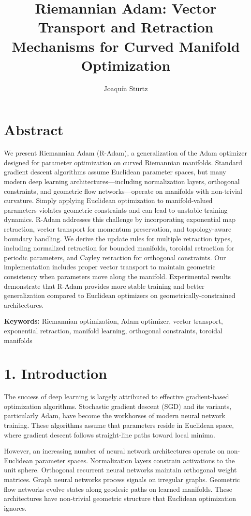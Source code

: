 \documentclass[12pt]{article}
\title{\textbf{Riemannian Adam: Vector Transport and Retraction Mechanisms for Curved Manifold Optimization}}
\author{Joaquín Stürtz}
\date{}
\begin{document}
\maketitle

\section*{Abstract}

We present Riemannian Adam (R-Adam), a generalization of the Adam optimizer designed for parameter optimization on curved Riemannian manifolds. Standard gradient descent algorithms assume Euclidean parameter spaces, but many modern deep learning architectures—including normalization layers, orthogonal constraints, and geometric flow networks—operate on manifolds with non-trivial curvature. Simply applying Euclidean optimization to manifold-valued parameters violates geometric constraints and can lead to unstable training dynamics. R-Adam addresses this challenge by incorporating exponential map retraction, vector transport for momentum preservation, and topology-aware boundary handling. We derive the update rules for multiple retraction types, including normalized retraction for bounded manifolds, toroidal retraction for periodic parameters, and Cayley retraction for orthogonal constraints. Our implementation includes proper vector transport to maintain geometric consistency when parameters move along the manifold. Experimental results demonstrate that R-Adam provides more stable training and better generalization compared to Euclidean optimizers on geometrically-constrained architectures.

\textbf{Keywords:} Riemannian optimization, Adam optimizer, vector transport, exponential retraction, manifold learning, orthogonal constraints, toroidal manifolds

\section{1. Introduction}

The success of deep learning is largely attributed to effective gradient-based optimization algorithms. Stochastic gradient descent (SGD) and its variants, particularly Adam, have become the workhorses of modern neural network training. These algorithms assume that parameters reside in Euclidean space, where gradient descent follows straight-line paths toward local minima.

However, an increasing number of neural network architectures operate on non-Euclidean parameter spaces. Normalization layers constrain activations to the unit sphere. Orthogonal recurrent neural networks maintain orthogonal weight matrices. Graph neural networks process signals on irregular graphs. Geometric flow networks evolve states along geodesic paths on learned manifolds. These architectures have non-trivial geometric structure that Euclidean optimization ignores.
\end{document}
